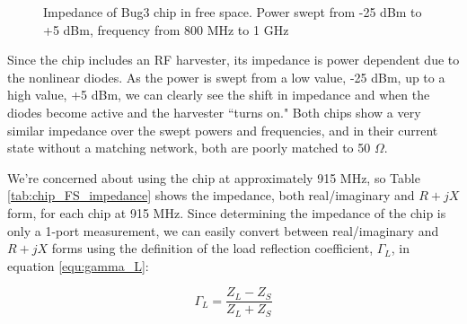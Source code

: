 \documentclass[12pt,onecolumn,titlepage]{article}
\begin{document}
\begin{figure}[T!]
	\centering
		\quad
	\label{fig:chip_FS_impedance}
	\caption{Impedance of Bug3 chip in free space. Power swept from -25 dBm to +5 dBm, frequency from 800 MHz to 1 GHz}
\end{figure}

Since the chip includes an RF harvester, its impedance is power dependent due to the nonlinear diodes. As the power is swept from a low value, -25 dBm, up to a high value, +5 dBm, we can clearly see the shift in impedance and when the diodes become active and the harvester ``turns on." Both chips show a very similar impedance over the swept powers and frequencies, and in their current state without a matching network, both are poorly matched to 50 $\Omega$.

We're concerned about using the chip at approximately 915 MHz, so Table \ref{tab:chip_FS_impedance} shows the impedance, both real/imaginary and $R+jX$ form, for each chip at 915 MHz. Since determining the impedance of the chip is only a 1-port measurement, we can easily convert between real/imaginary and $R+jX$ forms using the definition of the load reflection coefficient, $\Gamma_{L}$, in equation \ref{equ:gamma_L}:

\begin{equation}
\label{equ:gamma_L}
\Gamma_{L} = \frac{Z_L - Z_S}{Z_L + Z_S}
\end{equation}
\end{document}
